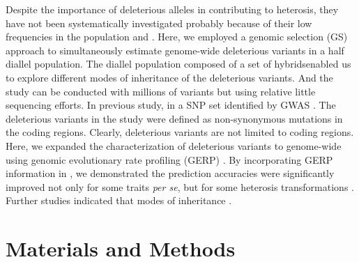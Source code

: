 \documentclass[9pt,twocolumn,twoside]{gsajnl}
\begin{document}
Despite the importance of deleterious alleles in contributing to heterosis, they have not been systematically investigated probably because of their low frequencies in the population and \DIFdelbegin {}\DIFdelend \DIFaddbegin {}\DIFaddend . Here, we employed a genomic selection (GS) approach to simultaneously estimate genome-wide deleterious variants in a half diallel population. The diallel population \DIFaddbegin {}\DIFaddend composed of a set of hybrids\DIFaddbegin {}\DIFaddend enabled us to explore different modes of inheritance of the deleterious variants. And the study can be conducted with millions of variants but using relative little sequencing efforts. In \DIFdelbegin {}\DIFdelend \DIFaddbegin {}\DIFaddend previous study, \DIFdelbegin {}\DIFdelend \DIFaddbegin {}\DIFaddend in a SNP set identified by GWAS \citep{Mezmouk2014}. The deleterious variants in the study were defined as non-synonymous mutations in the coding regions. Clearly, deleterious variants are not limited to coding regions. Here, we expanded the characterization of deleterious variants to genome-wide \DIFdelbegin {}\DIFdelend using genomic evolutionary rate profiling (GERP) \citep{Cooper2005}. By incorporating \DIFdelbegin {}\DIFdelend GERP information in \DIFdelbegin {}\DIFdelend \DIFaddbegin {}\DIFaddend , we demonstrated the prediction accuracies were significantly improved not only for some traits \emph{per se}, but \DIFaddbegin {}\DIFaddend for some heterosis transformations \DIFaddbegin {}\DIFaddend . Further studies indicated that \DIFdelbegin {}\DIFdelend \DIFaddbegin {}\DIFaddend modes of inheritance \DIFdelbegin {}\DIFdelend \DIFaddbegin {}\DIFaddend .


\section*{Materials and Methods} 
\DIFdelbegin \DIFdelend 
\end{document}
